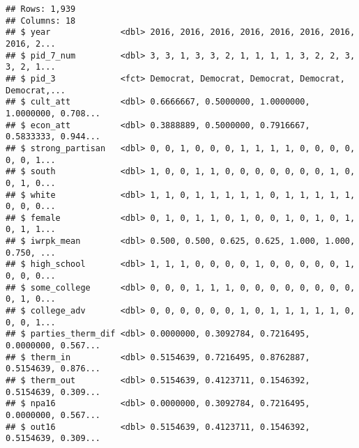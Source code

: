 \documentclass[
]{article}
\begin{document}
\begin{verbatim}
## Rows: 1,939
## Columns: 18
## $ year              <dbl> 2016, 2016, 2016, 2016, 2016, 2016, 2016, 2016, 2...
## $ pid_7_num         <dbl> 3, 3, 1, 3, 3, 2, 1, 1, 1, 1, 3, 2, 2, 3, 3, 2, 1...
## $ pid_3             <fct> Democrat, Democrat, Democrat, Democrat, Democrat,...
## $ cult_att          <dbl> 0.6666667, 0.5000000, 1.0000000, 1.0000000, 0.708...
## $ econ_att          <dbl> 0.3888889, 0.5000000, 0.7916667, 0.5833333, 0.944...
## $ strong_partisan   <dbl> 0, 0, 1, 0, 0, 0, 1, 1, 1, 1, 0, 0, 0, 0, 0, 0, 1...
## $ south             <dbl> 1, 0, 0, 1, 1, 0, 0, 0, 0, 0, 0, 0, 1, 0, 0, 1, 0...
## $ white             <dbl> 1, 1, 0, 1, 1, 1, 1, 1, 0, 1, 1, 1, 1, 1, 0, 0, 0...
## $ female            <dbl> 0, 1, 0, 1, 1, 0, 1, 0, 0, 1, 0, 1, 0, 1, 0, 1, 1...
## $ iwrpk_mean        <dbl> 0.500, 0.500, 0.625, 0.625, 1.000, 1.000, 0.750, ...
## $ high_school       <dbl> 1, 1, 1, 0, 0, 0, 0, 1, 0, 0, 0, 0, 0, 1, 0, 0, 0...
## $ some_college      <dbl> 0, 0, 0, 1, 1, 1, 0, 0, 0, 0, 0, 0, 0, 0, 0, 1, 0...
## $ college_adv       <dbl> 0, 0, 0, 0, 0, 0, 1, 0, 1, 1, 1, 1, 1, 0, 0, 0, 1...
## $ parties_therm_dif <dbl> 0.0000000, 0.3092784, 0.7216495, 0.0000000, 0.567...
## $ therm_in          <dbl> 0.5154639, 0.7216495, 0.8762887, 0.5154639, 0.876...
## $ therm_out         <dbl> 0.5154639, 0.4123711, 0.1546392, 0.5154639, 0.309...
## $ npa16             <dbl> 0.0000000, 0.3092784, 0.7216495, 0.0000000, 0.567...
## $ out16             <dbl> 0.5154639, 0.4123711, 0.1546392, 0.5154639, 0.309...
\end{verbatim}
\end{document}
